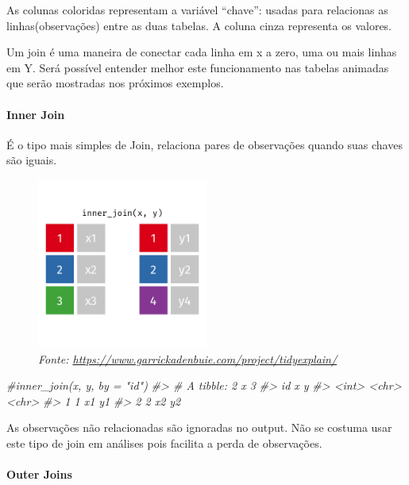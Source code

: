 \documentclass[
]{article}
\newenvironment{Shaded}{\begin{snugshade}}{\end{snugshade}}
\newcommand{\CommentTok}[1]{\textcolor[rgb]{0.56,0.35,0.01}{\textit{#1}}}
\begin{document}
As colunas coloridas representam a variável ``chave'': usadas para
relacionas as linhas(observações) entre as duas tabelas. A coluna cinza
representa os valores.

Um join é uma maneira de conectar cada linha em x a zero, uma ou mais
linhas em Y. Será possível entender melhor este funcionamento nas
tabelas animadas que serão mostradas nos próximos exemplos.

\hypertarget{inner-join}{%
\paragraph{Inner Join}\label{inner-join}}

É o tipo mais simples de Join, relaciona pares de observações quando
suas chaves são iguais.

\begin{figure}
\centering
\includegraphics[width=0.5\textwidth,height=\textheight]{inner-join.gif}
\caption{\emph{Fonte:
\url{https://www.garrickadenbuie.com/project/tidyexplain/}}}
\end{figure}

\begin{Shaded}
\begin{Highlighting}[]
\CommentTok{#inner_join(x, y, by = "id")}
\CommentTok{#> # A tibble: 2 x 3}
\CommentTok{#>      id x     y    }
\CommentTok{#>   <int> <chr> <chr>}
\CommentTok{#> 1     1 x1    y1   }
\CommentTok{#> 2     2 x2    y2}
\end{Highlighting}
\end{Shaded}

As observações não relacionadas são ignoradas no output. Não se costuma
usar este tipo de join em análises pois facilita a perda de observações.

\hypertarget{outer-joins}{%
\paragraph{Outer Joins}\label{outer-joins}}
\end{document}
